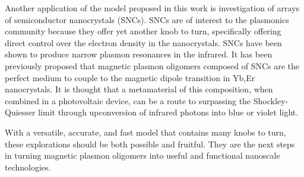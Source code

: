 \documentclass[12pt, letterpaper, twoside]{report}
\begin{document}
Another application of the model proposed in this work is investigation of arrays of semiconductor nanocrystals (SNCs). SNCs are of interest to the plasmonics community because they offer yet another knob to turn, specifically offering direct control over the electron density in the nanocrystals\cite{Gamelin2014}. SNCs have been shown to produce narrow plasmon resonances in the infrared. It has been previously proposed that magnetic plasmon oligomers composed of SNCs are the perfect medium to couple to the magnetic dipole transition in Yb,Er nanocrystals. It is thought that a metamaterial of this composition, when combined in a photovoltaic device, can be a route to surpassing the Shockley-Quiesser limit through upconversion of infrared photons into blue or violet light.

With a versatile, accurate, and fast model that contains many knobs to turn, these explorations should be both possible and fruitful. They are the next steps in turning magnetic plasmon oligomers into useful and functional nanoscale technologies.


\end{document}
